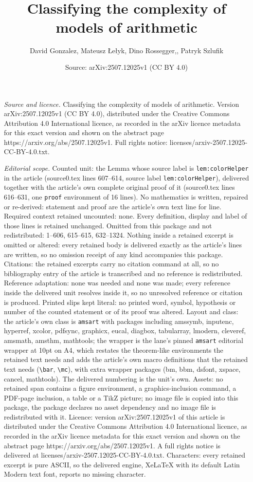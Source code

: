 \documentclass[10pt,a4paper]{amsart}
\title[Classifying the complexity of models of arithmetic]{Classifying the complexity of models of arithmetic}
\author{David Gonzalez, Mateusz {\L}e{\l}yk, Dino Rossegger,, Patryk Szlufik}
\date{Source: arXiv:2507.12025v1 (CC BY 4.0)}
\begin{document}
\maketitle

\noindent\emph{Source and licence.} Classifying the complexity of models of arithmetic. Version arXiv:2507.12025v1 (CC BY 4.0), distributed under the Creative Commons Attribution 4.0 International licence, as recorded in the arXiv licence metadata for this exact version and shown on the abstract page https://arxiv.org/abs/2507.12025v1. Full rights notice: licenses/arxiv-2507.12025-CC-BY-4.0.txt.\par\smallskip

\noindent\textit{Editorial scope.} Counted unit: the Lemma whose source label is \texttt{lem:colorHelper} in the article (source0.tex lines 607--614, source label \texttt{lem:colorHelper}), delivered together with the article's own complete original proof of it (source0.tex lines 616--631, one \texttt{proof} environment of 16 lines). No mathematics is written, repaired or re-derived: statement and proof are the article's own text line for line. Required context retained uncounted: none. Every definition, display and label of those lines is retained unchanged. Omitted from this package and not redistributed: 1--606, 615--615, 632--1324. Nothing inside a retained excerpt is omitted or altered: every retained body is delivered exactly as the article's lines are written, so no omission receipt of any kind accompanies this package. Citations: the retained excerpts carry no citation command at all, so no bibliography entry of the article is transcribed and no reference is redistributed. Reference adaptation: none was needed and none was made; every reference inside the delivered unit resolves inside it, so no unresolved reference or citation is produced. Printed slips kept literal: no printed word, symbol, hypothesis or number of the counted statement or of its proof was altered. Layout and class: the article's own class is \texttt{amsart} with packages including amssymb, inputenc, hyperref, xcolor, pdfsync, graphicx, eucal, diagbox, tabularray, lmodern, cleveref, amsmath, amsthm, mathtools; the wrapper is the lane's pinned \texttt{amsart} editorial wrapper at 10pt on A4, which restates the theorem-like environments the retained text needs and adds the article's own macro definitions that the retained text needs (\texttt{\textbackslash bar}, \texttt{\textbackslash mc}), with extra wrapper packages (bm, bbm, dsfont, xspace, cancel, mathtools). The delivered numbering is the unit's own. Assets: no retained span contains a figure environment, a graphics-inclusion command, a PDF-page inclusion, a table or a TikZ picture; no image file is copied into this package, the package declares no asset dependency and no image file is redistributed with it. Licence: version arXiv:2507.12025v1 of this article is distributed under the Creative Commons Attribution 4.0 International licence, as recorded in the arXiv licence metadata for this exact version and shown on the abstract page https://arxiv.org/abs/2507.12025v1. A full rights notice is delivered at licenses/arxiv-2507.12025-CC-BY-4.0.txt. Characters: every retained excerpt is pure ASCII, so the delivered engine, XeLaTeX with its default Latin Modern text font, reports no missing character.
\end{document}
